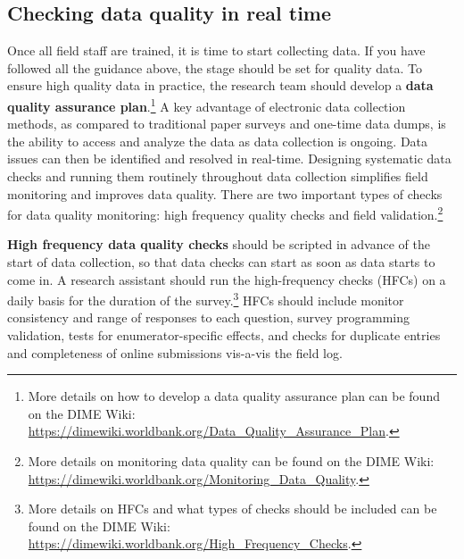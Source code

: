 \documentclass[
]{book}
\begin{document}
\hypertarget{checking-data-quality-in-real-time}{%
\subsection*{Checking data quality in real time}\label{checking-data-quality-in-real-time}}

Once all field staff are trained, it is time to start collecting data.
If you have followed all the guidance above, the stage should be set for quality data.
To ensure high quality data in practice,
the research team should develop a \textbf{data quality assurance plan}.\footnote{More details on how to develop a data quality assurance plan
  can be found on the DIME Wiki:
  \url{https://dimewiki.worldbank.org/Data_Quality_Assurance_Plan}.}
A key advantage of electronic data collection methods,
as compared to traditional paper surveys and one-time data dumps,
is the ability to access and analyze the data as data collection is ongoing.
Data issues can then be identified and resolved in real-time.
Designing systematic data checks and running them routinely throughout data collection
simplifies field monitoring and improves data quality.
There are two important types of checks for data quality monitoring:
high frequency quality checks and field validation.\footnote{More details on monitoring data quality
  can be found on the DIME Wiki:
  \url{https://dimewiki.worldbank.org/Monitoring_Data_Quality}.}

\textbf{High frequency data quality checks} should be scripted
in advance of the start of data collection,
so that data checks can start as soon as data starts to come in.
A research assistant should run the high-frequency checks (HFCs) on a daily basis
for the duration of the survey.\footnote{More details on HFCs and what types of checks should be included
  can be found on the DIME Wiki:
  \url{https://dimewiki.worldbank.org/High_Frequency_Checks}.}
HFCs should include monitor consistency and range of responses to each question,
survey programming validation, tests for enumerator-specific effects,
and checks for duplicate entries and completeness of online submissions vis-a-vis the field log.
\end{document}
